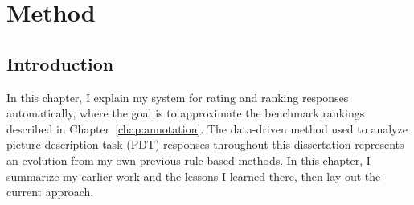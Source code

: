 \chapter{Method}
\label{chap:method}
\section{Introduction}
In this chapter, I explain my system for rating and ranking responses automatically, where the goal is to approximate the benchmark rankings described in Chapter~\ref{chap:annotation}. 
The data-driven method used to analyze picture description task (PDT) responses throughout this dissertation represents an evolution from my own previous rule-based methods. In this chapter, I summarize my earlier work and the lessons I learned there, then lay out the current approach.


